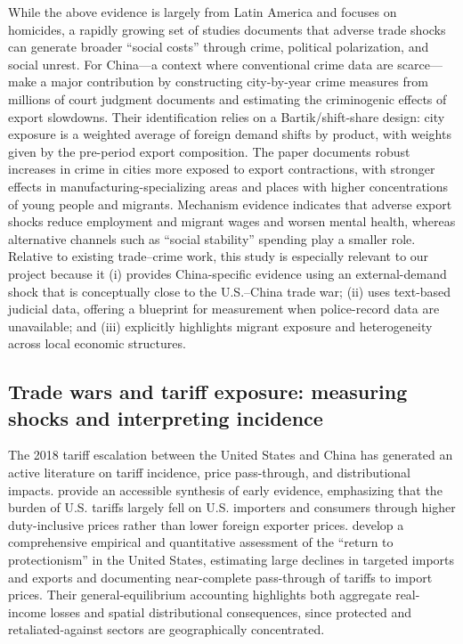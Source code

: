While the above evidence is largely from Latin America and focuses on homicides, a rapidly growing set of studies documents that adverse trade shocks can generate broader ``social costs'' through crime, political polarization, and social unrest. For China---a context where conventional crime data are scarce---\citet{ma2025export} make a major contribution by constructing city-by-year crime measures from millions of court judgment documents and estimating the criminogenic effects of export slowdowns. Their identification relies on a Bartik/shift-share design: city exposure is a weighted average of foreign demand shifts by product, with weights given by the pre-period export composition. The paper documents robust increases in crime in cities more exposed to export contractions, with stronger effects in manufacturing-specializing areas and places with higher concentrations of young people and migrants. Mechanism evidence indicates that adverse export shocks reduce employment and migrant wages and worsen mental health, whereas alternative channels such as ``social stability'' spending play a smaller role. Relative to existing trade--crime work, this study is especially relevant to our project because it (i) provides China-specific evidence using an external-demand shock that is conceptually close to the U.S.--China trade war; (ii) uses text-based judicial data, offering a blueprint for measurement when police-record data are unavailable; and (iii) explicitly highlights migrant exposure and heterogeneity across local economic structures.

\subsection{Trade wars and tariff exposure: measuring shocks and interpreting incidence}
\label{subsec:tariff_exposure}

The 2018 tariff escalation between the United States and China has generated an active literature on tariff incidence, price pass-through, and distributional impacts. \citet{amiti2019impact} provide an accessible synthesis of early evidence, emphasizing that the burden of U.S. tariffs largely fell on U.S. importers and consumers through higher duty-inclusive prices rather than lower foreign exporter prices. \citet{fajgelbaum2020return} develop a comprehensive empirical and quantitative assessment of the ``return to protectionism'' in the United States, estimating large declines in targeted imports and exports and documenting near-complete pass-through of tariffs to import prices. Their general-equilibrium accounting highlights both aggregate real-income losses and spatial distributional consequences, since protected and retaliated-against sectors are geographically concentrated.

